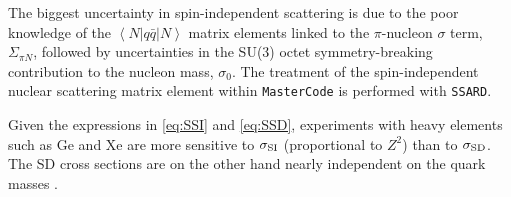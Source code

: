 The biggest uncertainty in spin-independent scattering is due to the poor knowledge of the $\left \langle N|q\bar{q}|N \right \rangle$ matrix elements linked to the $\pi$-nucleon $\sigma$ term, $\Sigma_{\pi N}$, followed by uncertainties in the  SU(3) octet symmetry-breaking contribution to the nucleon mass,  $\sigma_0$. The treatment of the spin-independent nuclear scattering matrix element within \texttt{MasterCode} is performed with \texttt{SSARD}. %

Given the expressions in \ref{eq:SSI} and \ref{eq:SSD}, experiments with heavy elements such as Ge and Xe are more sensitive to $\sigma_{\rm SI}$ (proportional to $Z^2$) than to $\sigma_{\rm SD}$. The SD cross sections are on the other hand nearly independent on the quark masses .  %

